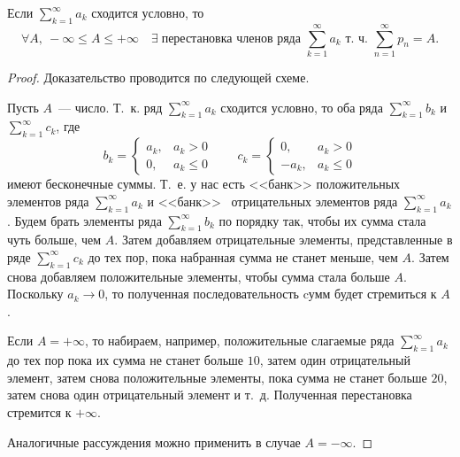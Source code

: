 \documentclass[../../main.tex]{subfiles}
\begin{document}
\begin{thm}[Риман]
	Если $\sum\limits_{k = 1}^{\infty} a_k$ сходится условно, то
	\[\forall A,\ - \infty \leq A \leq + \infty \quad \exists\;
	\text{перестановка членов ряда } \sum\limits_{k = 1}^{\infty} a_k \text{ т.~ч. }
	\sum\limits_{n = 1}^{\infty} p_n = A.\]
	\begin{proof}
		Доказательство проводится по следующей схеме.
		
		Пусть $A$~--- число. Т.~к. ряд
		$\sum\limits_{k = 1}^{\infty} a_k$ сходится условно, то оба ряда
		$\sum\limits_{k = 1}^{\infty} b_k$ и
		$\sum\limits_{k = 1}^{\infty} c_k$, где
		\[b_k = \begin{cases}
			a_k,& a_k > 0\\
			0,& a_k \le 0
		  \end{cases} \qquad
		 c_k = \begin{cases}
			0,& a_k > 0\\
			-a_k,& a_k \le 0
		  \end{cases}\]
		  имеют бесконечные суммы. Т.~е. у нас есть <<банк>> положительных
		  элементов	ряда $\sum\limits_{k = 1}^{\infty} a_k$ и <<банк>> \
		  отрицательных элементов ряда $\sum\limits_{k = 1}^{\infty} a_k$.
		  Будем брать элементы ряда $\sum\limits_{k = 1}^{\infty} b_k$
		  по порядку так, чтобы их сумма стала чуть больше, чем $A$.
		  Затем добавляем отрицательные элементы, представленные в ряде
		  $\sum\limits_{k = 1}^{\infty} c_k$ до тех пор, пока набранная
		  сумма не станет меньше, чем $A$. Затем снова добавляем положительные
		  элементы, чтобы сумма стала больше $A$. Поскольку $a_k \to 0$,
		  то полученная последовательность cумм будет стремиться к $A$.

		  Если $A = +\infty$, то набираем, например, положительные
		  слагаемые ряда $\sum\limits_{k = 1}^{\infty} a_k$ до тех пор
		  пока их сумма не станет больше $10$, затем один отрицательный элемент,
		  затем снова положительные элементы, пока сумма не станет больше $20$, затем снова один
		  отрицательный элемент и т.~д. Полученная перестановка стремится к
		  $+ \infty$.
		  
		  Аналогичные рассуждения можно применить в случае $A = -\infty$.
	\end{proof}
\end{thm}
\end{document}
